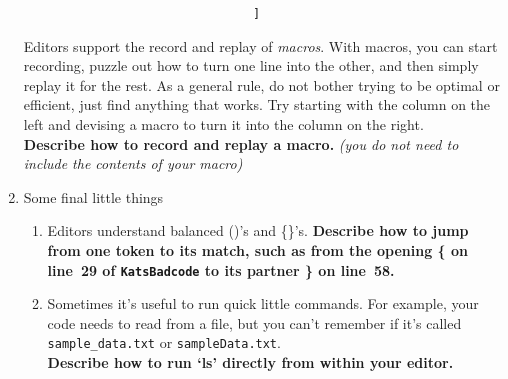 \documentclass{article}
\begin{document}
\begin{enumerate}
\begin{verbatim}
                                ]\end{verbatim}
    Editors support the record and replay of \emph{macros}. With macros, you
    can start recording, puzzle out how to turn one line into the other, and
    then simply replay it for the rest. As a general rule, do not bother
    trying to be optimal or efficient, just find anything that works.
    Try starting with the column on the left and devising a macro to turn it
    into the column on the right.\\
    \textbf{Describe how to record and replay a macro.}
    \emph{\small (you do not need to include the contents of your macro)}
    \vspace{6em}

\newpage
    \vspace{12em}
  \item Some final little things
    \small
    \begin{enumerate}
      \item Editors understand balanced ()'s and \{\}'s.
        \textbf{Describe how to jump from one token to its match, such as from
          the opening \{ on line~29 of \texttt{KatsBadcode} to its partner \}
          on line~58.
        }
        \vspace{4em}
      \item Sometimes it's useful to run quick little commands. For example,
        your code needs to read from a file, but you can't remember if it's
        called \texttt{sample\_data.txt} or \texttt{sampleData.txt}.\\
        \textbf{Describe how to run `ls' directly from within your editor.}
        \vspace{4em}
            \end{enumerate}
\end{enumerate}
\end{document}

